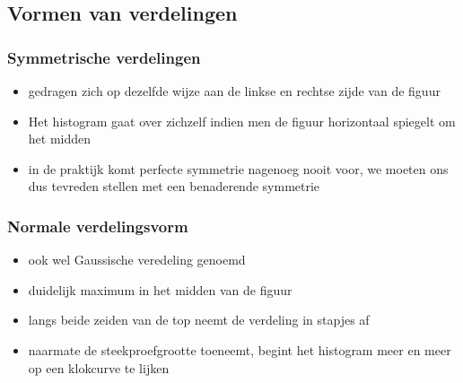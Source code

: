 \documentclass[titlepage]{article}
\numberwithin{equation}{section}
\begin{document}
\subsection{Vormen van verdelingen}
\subsubsection{Symmetrische verdelingen}
\begin{itemize}
	\item gedragen zich op dezelfde wijze aan de linkse en rechtse zijde van de figuur
	\item Het histogram gaat over zichzelf indien men de figuur horizontaal spiegelt om het midden
	\item in de praktijk komt perfecte symmetrie nagenoeg nooit voor, we moeten ons dus tevreden stellen met een benaderende symmetrie
\end{itemize}
\subsubsection{Normale verdelingsvorm}
\begin{itemize}
	\item ook wel Gaussische veredeling genoemd
	\item duidelijk maximum in het midden van de figuur
	\item langs beide zeiden van de top neemt de verdeling in stapjes af
	\item naarmate de steekproefgrootte toeneemt, begint het histogram meer en meer op een klokcurve te lijken
\end{itemize}
\end{document}
